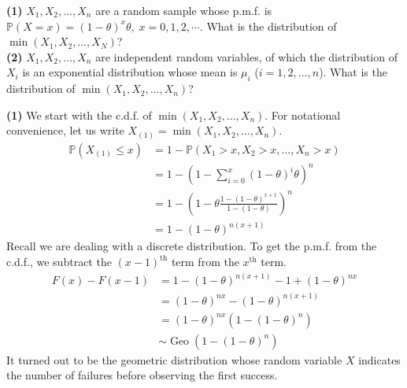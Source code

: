 \documentclass[answers]{exam}
\newcommand{\opn}{\operatorname}
\begin{document}
\newpage
{}
\begin{questions}
   \question
   \textbf{(1)} $X_{1}, X_{2}, \ldots , X_{n}$ are a random sample whose p.m.f. is $\mathbb{P}\left(X = x\right) = \left(1-\theta\right)^{x}\theta, \; x = 0, 1, 2, \cdots$. What is the distribution of $\min \left(X_{1}, X_{2}, \ldots , X_{N}\right)$?\\
   \textbf{(2)} $X_{1}, X_{2}, \ldots , X_{n}$ are independent random variables, of which the distribution of $X_{i}$ is an exponential distribution whose mean is $\mu_{i}$ ($i = 1, 2, \ldots , n$). What is the distribution of $\min \left(X_{1}, X_{2}, \ldots , X_{n}\right)$?
\begin{solution}
   \textbf{(1)} We start with the c.d.f. of $\min \left(X_{1}, X_{2}, \ldots , X_{n}\right)$. For notational convenience, let us write $X_{\left(1\right)} = \min \left(X_{1}, X_{2}, \ldots , X_{n}\right)$.
   \begin{align*}
      \mathbb{P}\left(X_{\left(1\right)} \leq x\right) &= 1 - \mathbb{P}\left(X_{1}>x, X_{2}>x, \ldots, X_{n}>x\right)\\
      &= 1-\left(1-\sum_{i=0}^{x}\left(1-\theta\right)^{i}\theta \right)^{n}\\
      &= 1 - \left(1-\theta \frac{1-\left(1-\theta\right)^{x+1}}{1-\left(1-\theta\right)}\right)^{n}\\
      &= 1- \left(1-\theta \right)^{n\left(x+1\right)}
   \end{align*}
   Recall we are dealing with a discrete distribution. To get the p.m.f. from the c.d.f., we subtract the $\left(x-1\right)^{\text{th}}$ term from the $x^{\text{th}}$ term.
   \begin{align*}
      F\left(x\right) - F\left(x-1\right) &= 1- \left(1-\theta\right)^{n\left(x+1\right)} - 1 + \left(1-\theta\right)^{nx}\\
      &= \left(1-\theta\right)^{nx} - \left(1-\theta\right)^{n\left(x+1\right)}\\
      &= \left(1-\theta\right)^{nx}\left(1 - \left(1-\theta\right)^{n} \right)\\
      &\sim \opn{Geo}\left(1-\left(1-\theta\right)^{n}\right)
   \end{align*}
   It turned out to be the geometric distribution whose random variable $X$ indicates the number of failures before observing the first success.

\end{solution}
\end{questions}
\end{document}
